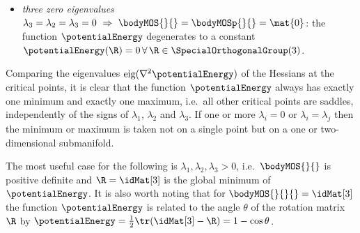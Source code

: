 \begin{Example}
\begin{itemize}
\item \textit{three zero eigenvalues} $\lambda_3 = \lambda_2 = \lambda_3 = 0 \ \Rightarrow \ \bodyMOS{}{} = \bodyMOSp{}{} = \mat{0}$: the function $\potentialEnergy$ degenerates to a constant $\potentialEnergy(\R) = 0 \, \forall \, \R \in \SpecialOrthogonalGroup(3)$.
\end{itemize}
Comparing the eigenvalues $\text{eig}(\nabla^2\potentialEnergy)$ of the Hessians at the critical points, it is clear that the function $\potentialEnergy$ always has exactly one minimum and exactly one maximum, i.e.\ all other critical points are saddles, independently of the signs of $\lambda_1$, $\lambda_2$ and $\lambda_3$.
If one or more $\lambda_i = 0$ or $\lambda_i=\lambda_j$ then the minimum or maximum is taken not on a single point but on a one or two-dimensional submanifold.

The most useful case for the following is $\lambda_1, \lambda_2, \lambda_3 > 0$, i.e.\ $\bodyMOS{}{}$ is positive definite and $\R = \idMat[3]$ is the global minimum of $\potentialEnergy$.
It is also worth noting that for $\bodyMOS{}{}{} = \idMat[3]$ the function $\potentialEnergy$ is related to the angle $\theta$ of the rotation matrix $\R$ by $\potentialEnergy = \tfrac{1}{2} \tr(\idMat[3] - \R) = 1 - \cos\theta$.
\end{Example}

